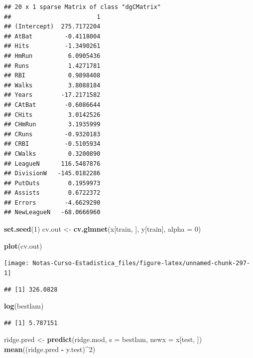 \documentclass[
  12pt,
]{book}
\newenvironment{Shaded}{\begin{snugshade}}{\end{snugshade}}
\newcommand{\DataTypeTok}[1]{\textcolor[rgb]{0.13,0.29,0.53}{#1}}
\newcommand{\DecValTok}[1]{\textcolor[rgb]{0.00,0.00,0.81}{#1}}
\newcommand{\KeywordTok}[1]{\textcolor[rgb]{0.13,0.29,0.53}{\textbf{#1}}}
\newcommand{\NormalTok}[1]{#1}
\newcommand{\OperatorTok}[1]{\textcolor[rgb]{0.81,0.36,0.00}{\textbf{#1}}}
\newcommand{\StringTok}[1]{\textcolor[rgb]{0.31,0.60,0.02}{#1}}
\theoremstyle{definition}
\theoremstyle{definition}
\theoremstyle{definition}
\theoremstyle{remark}
\begin{document}
\begin{verbatim}
## 20 x 1 sparse Matrix of class "dgCMatrix"
##                        1
## (Intercept)  275.7172204
## AtBat         -0.4118004
## Hits          -1.3490261
## HmRun          6.0905436
## Runs           1.4271781
## RBI            0.9898408
## Walks          3.8088184
## Years        -17.2171582
## CAtBat        -0.6086644
## CHits          3.0142526
## CHmRun         3.1935999
## CRuns         -0.9320183
## CRBI          -0.5105934
## CWalks         0.3200890
## LeagueN      116.5487876
## DivisionW   -145.0182286
## PutOuts        0.1959973
## Assists        0.6722372
## Errors        -4.6629290
## NewLeagueN   -68.0666960
\end{verbatim}

\begin{Shaded}
\begin{Highlighting}[]
\KeywordTok{set.seed}\NormalTok{(}\DecValTok{1}\NormalTok{)}
\NormalTok{cv.out <-}\StringTok{ }\KeywordTok{cv.glmnet}\NormalTok{(x[train, ], y[train], }\DataTypeTok{alpha =} \DecValTok{0}\NormalTok{)}

\KeywordTok{plot}\NormalTok{(cv.out)}
\end{Highlighting}
\end{Shaded}

\begin{center}\texttt{[image: Notas-Curso-Estadistica\_files/figure-latex/unnamed-chunk-297-1]} \end{center}

\begin{Shaded}
\end{Shaded}

\begin{verbatim}
## [1] 326.0828
\end{verbatim}

\begin{Shaded}
\begin{Highlighting}[]
\KeywordTok{log}\NormalTok{(bestlam)}
\end{Highlighting}
\end{Shaded}

\begin{verbatim}
## [1] 5.787151
\end{verbatim}

\begin{Shaded}
\begin{Highlighting}[]
\NormalTok{ridge.pred <-}\StringTok{ }\KeywordTok{predict}\NormalTok{(ridge.mod, }\DataTypeTok{s =}\NormalTok{ bestlam, }\DataTypeTok{newx =}\NormalTok{ x[test, }
\NormalTok{    ])}
\KeywordTok{mean}\NormalTok{((ridge.pred }\OperatorTok{-}\StringTok{ }\NormalTok{y.test)}\OperatorTok{^}\DecValTok{2}\NormalTok{)}
\end{Highlighting}
\end{Shaded}
\end{document}

